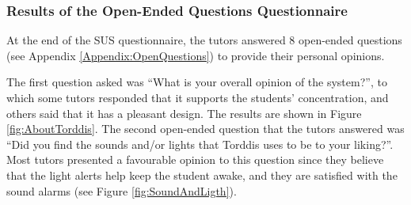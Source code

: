 \documentclass[a4paper,fleqn]{cas-sc}
\begin{document}
			\subsubsection{Results of the Open-Ended Questions Questionnaire}
				At the end of the SUS questionnaire, the tutors answered 8 open-ended questions (see Appendix \ref{Appendix:OpenQuestions}) to provide their personal opinions.
				
				The first question asked was ``What is your overall opinion of the system?'', to which some tutors responded that it supports the students' concentration, and others said that it has a pleasant design. The results are shown in Figure \ref{fig:AboutTorddis}. The second open-ended question that the tutors answered was ``Did you find the sounds and/or lights that Torddis uses to be to your liking?''. Most tutors presented a  favourable opinion to this question since they believe that the light alerts help keep the student awake, and they are satisfied with the sound alarms (see Figure \ref{fig:SoundAndLigth}).
				
\end{document}
